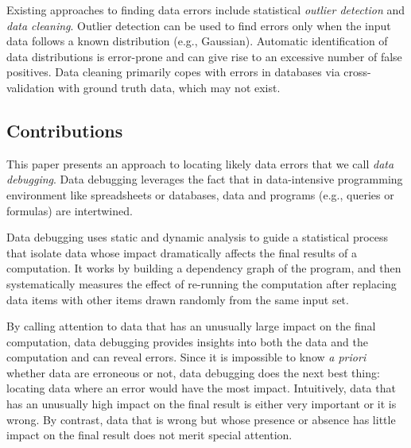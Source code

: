 
Existing approaches to finding data errors include
statistical \emph{outlier detection} and \emph{data cleaning}. Outlier
detection can be used to find errors only when the input data follows
a known distribution (e.g., Gaussian). Automatic identification of
data distributions is error-prone and can give rise to an excessive
number of false positives. Data cleaning primarily copes with errors
in databases via cross-validation with ground truth data, which may
not exist.

\subsection*{Contributions}

This paper presents an approach to locating likely data errors that we
call \emph{data debugging}. Data debugging leverages the fact that in
data-intensive programming environment like spreadsheets or databases,
data and programs (e.g., queries or formulas) are intertwined.


Data debugging uses static and dynamic analysis to guide a statistical
process that isolate data whose impact dramatically affects the final
results of a computation. It works by building a dependency graph of
the program, and then systematically measures the effect of re-running
the computation after replacing data items with other items drawn
randomly from the same input set.

By calling attention to data that has an unusually large impact on the
final computation, data debugging provides insights into both the data
and the computation and can reveal errors. Since it is impossible to
know \emph{a priori} whether data are erroneous or not, data debugging
does the next best thing: locating data where an error would have the
most impact. Intuitively, data that has an unusually high impact on
the final result is either very important or it is wrong. By
contrast, data that is wrong but whose presence or absence has little
impact on the final result does not merit special attention.

